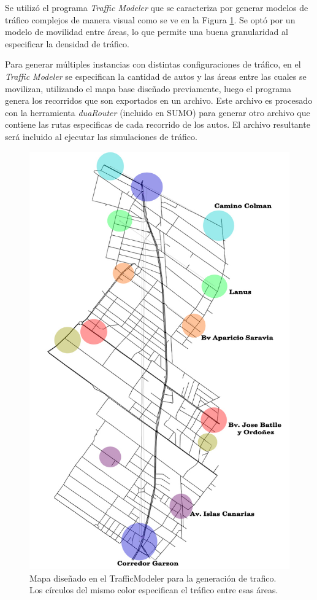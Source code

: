Se utilizó el programa \emph{Traffic Modeler} \citep{TrafficModeler} que se caracteriza por generar modelos de tráfico complejos de manera visual como se ve en la Figura \ref{fig:areaflow1}. Se optó por un modelo de movilidad entre áreas, lo que permite una buena granularidad al especificar la densidad de tráfico. 

Para generar múltiples instancias con distintas configuraciones de tráfico, en el \emph{Traffic Modeler} se especifican la cantidad de autos y las áreas entre las cuales se movilizan, utilizando el mapa base diseñado previamente, luego el programa genera los recorridos que son exportados en un archivo. Este archivo es procesado con la herramienta \emph{duaRouter} (incluido en SUMO) para generar otro archivo que contiene las rutas especificas de cada recorrido de los autos. El archivo resultante será incluido al ejecutar las simulaciones de tráfico.





\begin{figure}[ht]
	\centering
	\includegraphics[width=0.5\linewidth]{Figures/areaflow1}
	\caption[Mapa diseñado en el TrafficModeler para la generación de tráfico.]{Mapa diseñado en el TrafficModeler para la generación de trafico. Los círculos del mismo color especifican el tráfico entre esas áreas. }
	\label{fig:areaflow1}
\end{figure}

